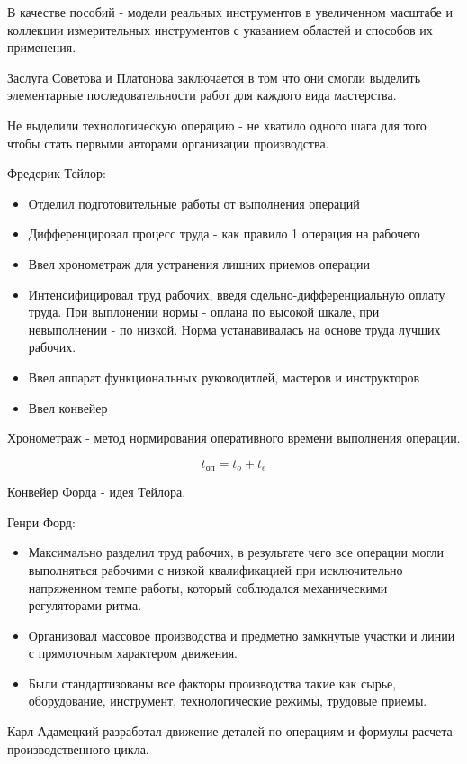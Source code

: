 \documentclass[14pt,a4paper,oneside]{extarticle}
\begin{document}
В качестве пособий - модели реальных инструментов в увеличенном масштабе и коллекции измерительных инструментов с указанием областей и способов их применения.

Заслуга Советова и Платонова заключается в том что они смогли выделить элементарные последовательности работ для каждого вида мастерства.

Не выделили технологическую операцию - не хватило одного шага для того чтобы стать первыми авторами организации производства.

Фредерик Тейлор:

\begin{itemize}
    \item Отделил подготовительные работы от выполнения операций
    \item Дифференцировал процесс труда - как правило 1 операция на рабочего
    \item Ввел хронометраж для устранения лишних приемов операции
    \item Интенсифицировал труд рабочих, введя сдельно-дифференциальную оплату труда. При выплонении нормы - оплана по высокой шкале, при невыполнении - по низкой. Норма устанавивалась на основе труда лучших рабочих.
    \item Ввел аппарат функциональных руководитлей, мастеров и инструкторов
    \item Ввел конвейер
\end{itemize}

Хронометраж - метод нормирования оперативного времени выполнения операции.

\[t_\text{оп}=t_o+t_e\]

Конвейер Форда - идея Тейлора.

Генри Форд:

\begin{itemize}
    \item Максимально разделил труд рабочих, в результате чего все операции могли выполняться рабочими с низкой квалификацией при исключительно напряженном темпе работы, который соблюдался механическими регуляторами ритма.
    \item Организовал массовое производства и предметно замкнутые участки и линии с прямоточным характером движения.
    \item Были стандартизованы все факторы производства такие как сырье, оборудование, инструмент, технологические режимы, трудовые приемы.
\end{itemize}

Карл Адамецкий разработал движение деталей по операциям и формулы расчета производственного цикла.
\end{document}
